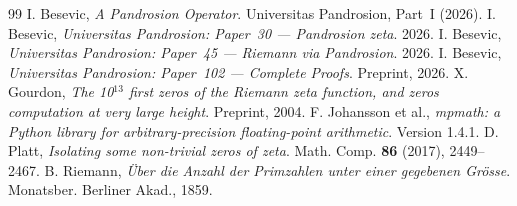 \documentclass[11pt,a4paper]{article}
\begin{document}
\begin{thebibliography}{99}
 I. Besevic, \textit{A Pandrosion Operator}. Universitas Pandrosion, Part~I (2026).
 I. Besevic, \textit{Universitas Pandrosion: Paper~30 --- Pandrosion zeta}. 2026.
 I. Besevic, \textit{Universitas Pandrosion: Paper~45 --- Riemann via Pandrosion}. 2026.
 I. Besevic, \textit{Universitas Pandrosion: Paper~102 --- Complete Proofs}. Preprint, 2026.
 X. Gourdon, \textit{The 10$^{13}$ first zeros of the Riemann zeta function, and zeros computation at very large height}. Preprint, 2004.
 F. Johansson et al., \textit{mpmath: a Python library for arbitrary-precision floating-point arithmetic}. Version 1.4.1.
 D. Platt, \textit{Isolating some non-trivial zeros of zeta}. Math. Comp. \textbf{86} (2017), 2449--2467.
 B. Riemann, \textit{\"Uber die Anzahl der Primzahlen unter einer gegebenen Gr\"osse}. Monatsber. Berliner Akad., 1859.
\end{thebibliography}
\end{document}
